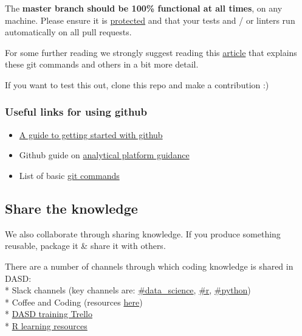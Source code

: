 \documentclass[]{book}
\providecommand{\tightlist}{%
  \setlength{\itemsep}{0pt}\setlength{\parskip}{0pt}}
\begin{document}
The \textbf{master branch should be 100\% functional at all times}, on any machine. Please ensure it is \href{https://help.github.com/articles/about-protected-branches/}{protected} and that your tests and / or linters run automatically on all pull requests.

For some further reading we strongly suggest reading this \href{https://gist.github.com/blackfalcon/8428401}{article} that explains these git commands and others in a bit more detail.

If you want to test this out, clone this repo and make a contribution :)

\hypertarget{gitlink}{%
\subsubsection*{Useful links for using github}\label{gitlink}}

\begin{itemize}
\tightlist
\item
  \href{https://jennybc.github.io/2014-05-12-ubc/ubc-r/session2.4_github.html}{A guide to getting started with github}\\
\item
  Github guide on \href{https://user-guidance.services.alpha.mojanalytics.xyz/github.html\#creating-your-project-repo-on-github}{analytical platform guidance}\\
\item
  List of basic \href{https://guides.github.com/introduction/git-handbook/}{git commands}
\end{itemize}

\hypertarget{knowledge}{%
\subsection{Share the knowledge}\label{knowledge}}

We also collaborate through sharing knowledge. If you produce something reusable, package it \& share it with others.

There are a number of channels through which coding knowledge is shared in DASD:\\
* Slack channels (key channels are: \href{https://app.slack.com/client/T1PU1AP6D/C1Z8Q18LS}{\#data\_science}, \href{https://app.slack.com/client/T1PU1AP6D/C1PUCG719}{\#r}, \href{https://app.slack.com/client/T1PU1AP6D/C1Q09V86S}{\#python})\\
* Coffee and Coding (resources \href{https://github.com/moj-analytical-services/Coffee-and-Coding}{here})\\
* \href{https://trello.com/b/zAwm6sCc/dasd-training}{DASD training Trello}\\
* \href{https://docs.google.com/document/d/1R4hBMf26T9HEnCdVz56PpZhwiCv5RhberYL3BxOSKsA/edit}{R learning resources}
\end{document}

